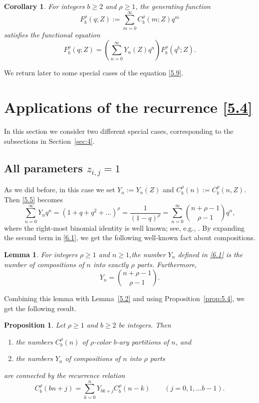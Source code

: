 \documentclass{amsart}
\theoremstyle{plain}
\newtheorem{corollary}[theorem]{Corollary}
\newtheorem{proposition}[theorem]{Proposition}
\newtheorem{lemma}[theorem]{Lemma}
\numberwithin{equation}{section}
\begin{document}
\begin{corollary}\label{cor:5.5}
For integers $b\geq 2$ and $\rho\geq 1$, the generating function
\[
F_b^\rho(q;Z):=\sum_{m=0}^\infty C_b^\rho(m;Z)q^m
\]
satisfies the functional equation
\begin{equation}\label{5.9}
F_b^\rho(q;Z) =\left(\sum_{n=0}^\infty Y_n(Z)q^n\right)F_b^\rho(q^b;Z).
\end{equation}
\end{corollary}

We return later to some special cases of the equation \eqref{5.9}.

\section{Applications of the recurrence \eqref{5.4}}\label{sec:6}

In this section we consider two different special cases, corresponding to the
subsections in Section~\ref{sec:4}.

\subsection{All parameters $z_{i,j}=1$}\label{sec:6.1}

As we did before, in this case we set $Y_n:=Y_n(Z)$ and 
$C_b^\rho(n):=C_b^\rho(n,Z)$. Then \eqref{5.5} becomes
\begin{equation}\label{6.1}
\sum_{n=0}^\infty Y_nq^n = \left(1+q+q^2+\dots\right)^\rho=\frac{1}{(1-q)^\rho}
=\sum_{n=0}^\infty\binom{n+\rho-1}{\rho-1}q^n,
\end{equation}
where the right-most binomial identity is well known; see, e.g.,
\cite[eq.~(1.3)]{Go}. By expanding the second term in \eqref{6.1}, we get the
following well-known fact about compositions.

\begin{lemma}\label{lem:6.1}
For integers $\rho\geq 1$ and $n\geq 1$,the number $Y_n$ defined in \eqref{6.1}
is the number of compositions of $n$ into exactly $\rho$ parts. Furthermore,
\begin{equation}\label{6.2}
Y_n = \binom{n+\rho-1}{\rho-1}.
\end{equation}
\end{lemma}

Combining this lemma with Lemma~\ref{5.2} and using Proposition~\ref{prop:5.4},
we get the following result.

\begin{proposition}\label{prop:6.2}
Let $\rho\geq 1$ and $b\geq 2$ be integers. Then
\begin{enumerate}
\item[(a)] the numbers $C_b^\rho(n)$ of $\rho$-color $b$-ary partitions 
of $n$, and 
\item[(b)] the numbers $Y_n$ of compositions of $n$ into $\rho$ parts
\end{enumerate}
are connected by the recurrence relation
\begin{equation}\label{6.3}
C_b^\rho(bn+j)=\sum_{k=0}^n Y_{bk+j}C_b^\rho(n-k) \qquad (j=0, 1,\ldots b-1).
\end{equation}
\end{proposition}
\end{document}
